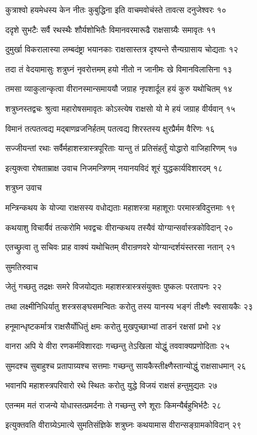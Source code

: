 कुत्राश्वो हयमेधस्य केन नीतः कुबुद्धिना
इति वाचमवोचंस्ते तावत्स दनुजेश्वरः १०

ददृशे सुभटैः सर्वै रथस्थैः शौर्यशोभितैः
विमानवरमारूढै राक्षसाग्र्यैः समावृतः ११

दुमुर्खा विकरालास्या लम्बदंष्ट्रा भयानकाः
राक्षसास्तत्र दृश्यन्ते सैन्यग्रासाय चोद्यताः १२

तदा तं वेदयामासुः शत्रुघ्नं नृवरोत्तमम्
हयो नीतो न जानीमः खे विमानविलासिना १३

तमसा व्याकुलान्कृत्वा वीरानस्मान्समाययौ
जग्राह नृपशार्दूल हयं कुरु यथोचितम् १४

शत्रुघ्नस्तद्वचः श्रुत्वा महारोषसमावृतः
कोऽस्त्येष राक्षसो यो मे हयं जग्राह वीर्यवान् १५

विमानं तत्पतत्वद्य मद्बाणव्रजनिर्हतम्
पतत्वद्य शिरस्तस्य क्षुरप्रैर्मम वैरिणः १६

सज्जीयन्तां रथाः सर्वैर्महाशस्त्रास्त्रपूरिताः
यान्तु तं प्रतिसंहर्तुं योद्धारो वाजिहारिणम् १७

इत्युक्त्वा रोषताम्राक्ष उवाच निजमन्त्रिणम्
नयानयविदं शूरं युद्धकार्यविशारदम् १८

शत्रुघ्न उवाच

मन्त्रिन्कथय के योज्या राक्षसस्य वधोद्यताः
महाशस्त्रा महाशूराः परमास्त्रविदुत्तमाः १९

कथयाशु विचार्यैवं तत्करोमि भवद्वचः
वीरान्कथय तस्यैवं योग्यान्सर्वास्त्रकोविदान् २०

एतच्छ्रुत्वा तु सचिवः प्राह वाक्यं यथोचितम्
वीरान्रणवरे योग्यान्दर्शयंस्तरसा नतान् २१

सुमतिरुवाच

जेतुं गच्छतु तद्रक्षः समरे विजयोद्यतः
महाशस्त्रास्त्रसंयुक्तः पुष्कलः परतापनः २२

तथा लक्ष्मीनिधिर्यातु शस्त्रसङ्घसमन्वितः
करोतु तस्य यानस्य भङ्गं तीक्ष्णैः स्वसायकैः २३

हनूमान्धृष्टकर्मात्र राक्षसैर्योधितुं क्षमः
करोतु मुखपुच्छाभ्यां ताडनं रक्षसां प्रभो २४

वानरा अपि ये वीरा रणकर्मविशारदाः
गच्छन्तु तेऽखिला योद्धुं तववाक्यप्रणोदिताः २५

सुमदश्च सुबाहुश्च प्रतापाग्र्यश्च सत्तमाः
गच्छन्तु सायकैस्तीक्ष्णैस्तान्योद्धुं राक्षसाधमान् २६

भवानपि महाशस्त्रपरिवारो रथे स्थितः
करोतु युद्धे विजयं राक्षसं हन्तुमुद्यतः २७

एतन्मम मतं राजन्ये योधास्तत्प्रमर्दनाः
ते गच्छन्तु रणे शूराः किमन्यैर्बहुभिर्भटैः २८

इत्युक्तवति वीराग्र्येऽमात्ये सुमतिसंज्ञिके
शत्रुघ्नः कथयामास वीरान्सङ्ग्रामकोविदान् २९

